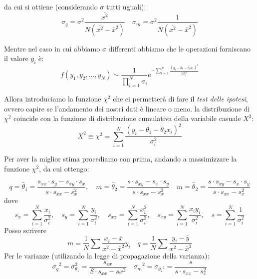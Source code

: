 \documentclass{article}
\begin{document}
da cui si ottiene (considerando $\sigma$ tutti uguali):
\begin{equation*}
\sigma_q=\sigma^2\frac{\bar{x^2}}{N(\bar{x^2}-\bar{x}^2)}
\quad
\sigma_m=\sigma^2\frac{1}{N(\bar{x^2}-\bar{x}^2)}
\end{equation*}

Mentre nel caso in cui abbiamo $\sigma$ differenti abbiamo che le operazioni forniscano il valore $y_i$ è:
\[ f(y_1, y_2, \ldots, y_N) \sim \frac{1}{\prod_{i=1}^N \sigma_i} e^{-\sum_{i=1}^N \frac{(y_i - \theta_1 - \theta_2 x_i)^2}{2\sigma_i^2}} \]

Allora introduciamo la funzione $\chi^2$ che ci permetterà di fare il \textit{test delle ipotesi}, ovvero capire se l'andamento dei nostri dati è
lineare o meno. la distribuzione di $\chi^2$ coincide con la funzione di distribuzione cumulativa della variabile casuale $X^2$:
\[ X^2 \equiv \chi^2 = \sum_{i=1}^N \frac{(y_i - \theta_1 - \theta_2 x_i)^2}{\sigma_i^2} \]

Per aver la miglior stima procediamo con prima, andando a massimizzare la funzione $\chi^2$, da cui ottengo:

\begin{equation*}
q = \hat{\theta}_1 = \frac{s_{xx} \cdot s_y - s_{xy} \cdot s_x}{s \cdot s_{xx} - s_x^2}, \quad m = \hat{\theta}_2 = \frac{s \cdot s_{xy} - s_x \cdot s_y}{s \cdot s_{xx} - s_x^2}
\quad
m = \hat{\theta}_2 = \frac{s \cdot s_{xy} - s_x \cdot s_y}{s \cdot s_{xx} - s_x^2}
\end{equation*}
dove 
\[
s_x = \sum_{i=1}^N \frac{x_i}{\sigma_i^2}, \quad s_y = \sum_{i=1}^N \frac{y_i}{\sigma_i^2}, \quad s_{xx} = \sum_{i=1}^N \frac{x_i^2}{\sigma_i^2}, \quad s_{xy} = \sum_{i=1}^N \frac{x_i y_i}{\sigma_i^2}, \quad s = \sum_{i=1}^N \frac{1}{\sigma_i^2}
\]
Posso scrivere 
\[
m= \frac{1}{N} \sum \frac{x_i - \bar{x}}{x^2 - {\bar{x}}^2} y_i \quad q = \frac{1}{N} \sum \frac{y_i - \bar{y}}{x^2 - {\bar{x}}^2}
\]
Per le varianze (utilizando la legge di propagazione della varianza):
\begin{equation*}
{\sigma_q}^2 = \sigma_{\theta_1}^2 = \frac{s_{xx}}{S \cdot s_{xx} - sx^2}
\quad
{\sigma_m}^2 = \sigma_{{\theta_2}^2} = \frac{s}{s \cdot s_{xx} - s_x^2}
\end{equation*}
\end{document}
